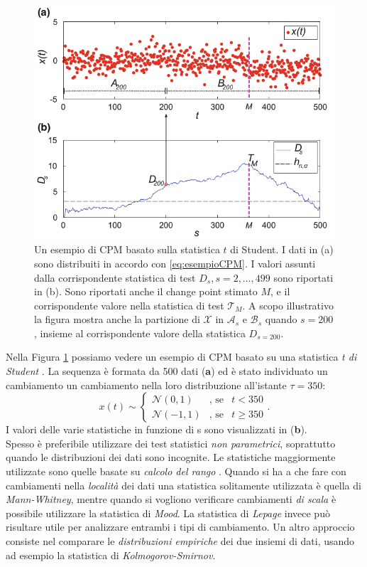 \begin{figure}
	\centering
	\includegraphics[width=12cm,keepaspectratio]{pictures/CPM}
	\caption[Esempio di CPM]{Un esempio di CPM basato sulla statistica $t$ di Student. I dati in (a) sono distribuiti in accordo con \eqref{eq:esempioCPM}. I valori assunti dalla corrispondente statistica di test ${D_s,s=2,\dots,499}$ sono riportati in (b). Sono riportati anche il change point stimato $M$, e il corrispondente valore nella statistica di test $\mathcal{T}_M$. A scopo illustrativo la figura mostra anche  la partizione di $\mathcal{X}$ in $\mathcal{A}_s$ e $\mathcal{B}_s$ quando $s=200$, insieme al corrispondente valore della statistica $D_{s=200}$.}
	\label{fig:CPM}
\end{figure}
Nella Figura \ref{fig:CPM} possiamo vedere un esempio di CPM basato su una statistica \textit{t di Student} \cite{alippi2014intelligence}. La sequenza \`e formata da 500 dati (\textbf{a}) ed \`e stato individuato un cambiamento un cambiamento nella loro distribuzione all'istante $\tau=350$:
\begin{equation}
	\label{eq:esempioCPM}
	x(t)\sim \left\{ \begin{array} {lcl}
	\mathcal{N}(0,1) & \mbox{, se} & t< 350 \\
	\mathcal{N}(-1,1) & \mbox{, se} & t\geq 350 \end{array} \right. .
\end{equation} 
I valori delle varie statistiche in funzione di s sono visualizzati in (\textbf{b}).\\
Spesso \`e preferibile utilizzare dei test
statistici \textit{non parametrici},
soprattutto quando le distribuzioni dei dati
sono incognite. Le statistiche maggiormente
utilizzate sono quelle basate su
\textit{calcolo del rango}
\cite{ross2011nonparametric}. Quando si ha a
che fare con cambiamenti nella
\textit{localit\`a} dei dati una statistica
solitamente utilizzata \`e quella di
\textit{Mann-Whitney}, mentre quando si
vogliono verificare cambiamenti \textit{di
	scala} \`e possibile utilizzare la
statistica di \textit{Mood}. La statistica di
\textit{Lepage} invece pu\`o risultare utile
per analizzare entrambi i tipi di
cambiamento. Un altro approccio consiste nel
comparare le \textit{distribuzioni empiriche}
dei due insiemi di dati, usando ad esempio la
statistica di \textit{Kolmogorov-Smirnov}.
